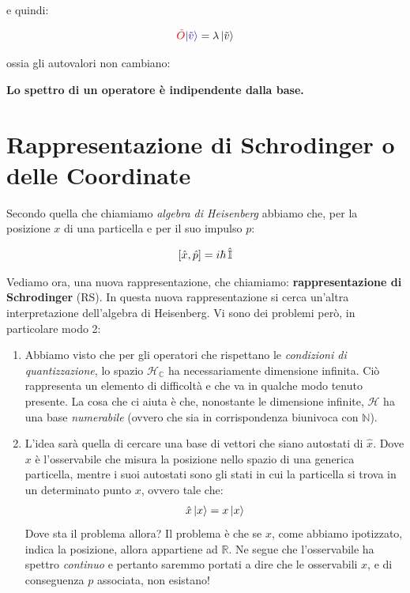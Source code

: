 	e quindi:
	
\begin{align*}
	\textcolor{red}{\tilde{O}}  \textcolor{blue}{\ket{\tilde{v}}} = \lambda \ket{\tilde{v}}
\end{align*}

	ossia gli autovalori non cambiano: 

\begin{nb}
	\textbf{Lo spettro di un operatore è indipendente dalla base.} 
\end{nb}

\section{Rappresentazione di Schrodinger o delle Coordinate}	

	Secondo quella che chiamiamo \textit{algebra di Heisenberg} abbiamo che, per la posizione $x$ di una particella e per il suo impulso $p$:
	
\begin{align*}
	\qty[\hat{x}, \hat{p}] = i \hbar \,  \hat{\mathbb{I}}
\end{align*}

	Vediamo ora, una nuova rappresentazione, che chiamiamo: \textbf{rappresentazione di Schrodinger} (RS). In questa nuova rappresentazione si cerca un'altra interpretazione dell'algebra di Heisenberg. Vi sono dei problemi però, in particolare modo 2:
	
\begin{enumerate}[label=\arabic*)]
	\item Abbiamo visto che per gli operatori che rispettano le \textit{condizioni di quantizzazione}, lo spazio $\mathcal{H}_{\mathbb{C}}$ ha necessariamente dimensione infinita. Ciò rappresenta un elemento di difficoltà e che va in qualche modo tenuto presente. La cosa che ci aiuta è che, nonostante le dimensione infinite, $\mathcal{H}$ ha una base \textit{numerabile} (ovvero che sia in corrispondenza biunivoca con $\mathbb{N}$).
	\item L'idea sarà quella di cercare una base di vettori che siano autostati di $\hat{x}$. Dove $x$ è l'osservabile che misura la posizione nello spazio di una generica particella, mentre i suoi autostati sono gli stati in cui la particella si trova in un determinato punto $x$, ovvero tale che:
\begin{align*}
	\hat{x} \ket{x} = x \ket{x}
\end{align*}
	Dove sta il problema allora? Il problema è che se $x$, come abbiamo ipotizzato, indica la posizione, allora appartiene ad $\mathbb{R}$. Ne segue che l'osservabile ha spettro \textit{continuo} e pertanto saremmo portati a dire che le osservabili $x$, e di conseguenza $p$ associata, non esistano!
\end{enumerate}

